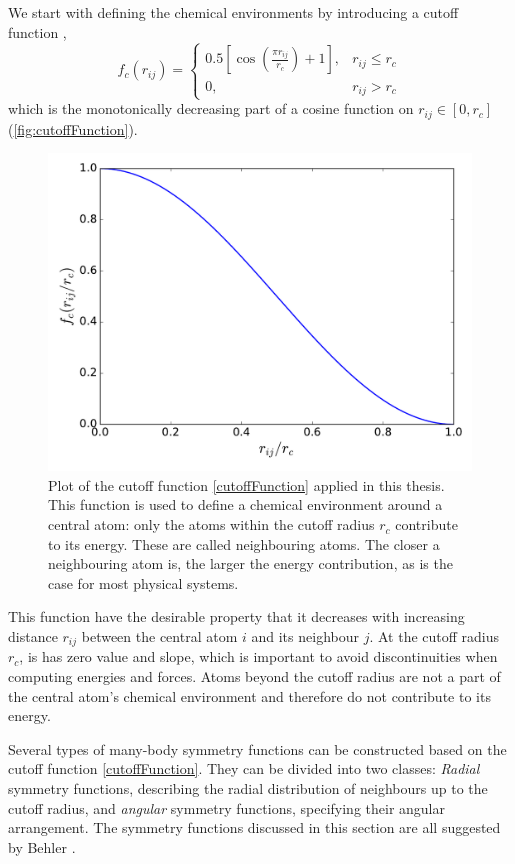 \documentclass[twoside,english]{uiofysmaster}
\begin{document}
We start with defining the chemical environments by introducing a cutoff function \cite{Behler11symmetry},
\begin{equation}
 f_c(r_{ij}) = 
\begin{cases}
0.5 \!\left[\cos\left(\frac{\pi r_{ij}}{r_c}\right) + 1 \right], & r_{ij} \leq r_c \\
0, & r_{ij} > r_c
\end{cases}
\label{cutoffFunction}
\end{equation}
which is the monotonically decreasing part of a cosine function on $r_{ij} \in [0,r_c]$ (\autoref{fig:cutoffFunction}). 
\begin{figure}
 \centering
  \includegraphics[width = 0.7\linewidth]{Figures/Theory/cutoffFunction.pdf}
  \caption{Plot of the cutoff function \eqref{cutoffFunction} applied in this thesis. 
	   This function is used to define a chemical environment around a central atom:
           only the atoms within the cutoff radius $r_c$ contribute to its energy. 
           These are called neighbouring atoms. The closer a neighbouring atom is, the larger
           the energy contribution, as is the case for most physical systems.}
  \label{fig:cutoffFunction}
\end{figure}
This function have the desirable property that it decreases with increasing distance $r_{ij}$ between the central
atom $i$ and its neighbour $j$. At the cutoff radius $r_c$, is has zero value and slope, which is important
to avoid discontinuities when computing energies and forces. Atoms beyond the cutoff radius are not a part of the central
atom's chemical environment and therefore do not contribute to its energy. 

Several types of many-body symmetry functions can be
constructed based on the cutoff function \eqref{cutoffFunction}. 
They can be divided into two classes: \textit{Radial} symmetry functions, describing 
the radial distribution of neighbours up to the cutoff radius, and \textit{angular} symmetry functions, specifying their
angular arrangement. The symmetry functions discussed in this section are all suggested by Behler \cite{Behler11symmetry}. 
\end{document}
